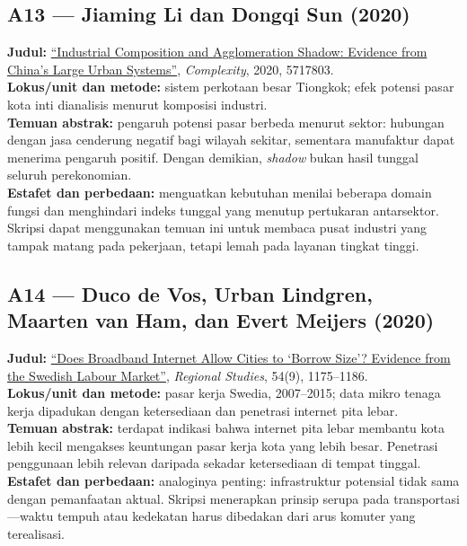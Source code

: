 \documentclass[
  indonesian,
  11pt,
  a4paper,
  oneside,
  openany]{report}
\begin{document}
\subsection{A13 --- Jiaming Li dan Dongqi Sun
(2020)}\label{a13-jiaming-li-dan-dongqi-sun-2020}

\textbf{Judul:} \href{https://doi.org/10.1155/2020/5717803}{``Industrial
Composition and Agglomeration Shadow: Evidence from China's Large Urban
Systems''}, \emph{Complexity}, 2020, 5717803.\\
\textbf{Lokus/unit dan metode:} sistem perkotaan besar Tiongkok; efek
potensi pasar kota inti dianalisis menurut komposisi industri.\\
\textbf{Temuan abstrak:} pengaruh potensi pasar berbeda menurut sektor:
hubungan dengan jasa cenderung negatif bagi wilayah sekitar, sementara
manufaktur dapat menerima pengaruh positif. Dengan demikian,
\emph{shadow} bukan hasil tunggal seluruh perekonomian.\\
\textbf{Estafet dan perbedaan:} menguatkan kebutuhan menilai beberapa
domain fungsi dan menghindari indeks tunggal yang menutup pertukaran
antarsektor. Skripsi dapat menggunakan temuan ini untuk membaca pusat
industri yang tampak matang pada pekerjaan, tetapi lemah pada layanan
tingkat tinggi.

\subsection{A14 --- Duco de Vos, Urban Lindgren, Maarten van Ham, dan
Evert Meijers
(2020)}\label{a14-duco-de-vos-urban-lindgren-maarten-van-ham-dan-evert-meijers-2020}

\textbf{Judul:}
\href{https://doi.org/10.1080/00343404.2019.1699238}{``Does Broadband
Internet Allow Cities to `Borrow Size'? Evidence from the Swedish Labour
Market''}, \emph{Regional Studies}, 54(9), 1175--1186.\\
\textbf{Lokus/unit dan metode:} pasar kerja Swedia, 2007--2015; data
mikro tenaga kerja dipadukan dengan ketersediaan dan penetrasi internet
pita lebar.\\
\textbf{Temuan abstrak:} terdapat indikasi bahwa internet pita lebar
membantu kota lebih kecil mengakses keuntungan pasar kerja kota yang
lebih besar. Penetrasi penggunaan lebih relevan daripada sekadar
ketersediaan di tempat tinggal.\\
\textbf{Estafet dan perbedaan:} analoginya penting: infrastruktur
potensial tidak sama dengan pemanfaatan aktual. Skripsi menerapkan
prinsip serupa pada transportasi---waktu tempuh atau kedekatan harus
dibedakan dari arus komuter yang terealisasi.
\end{document}
